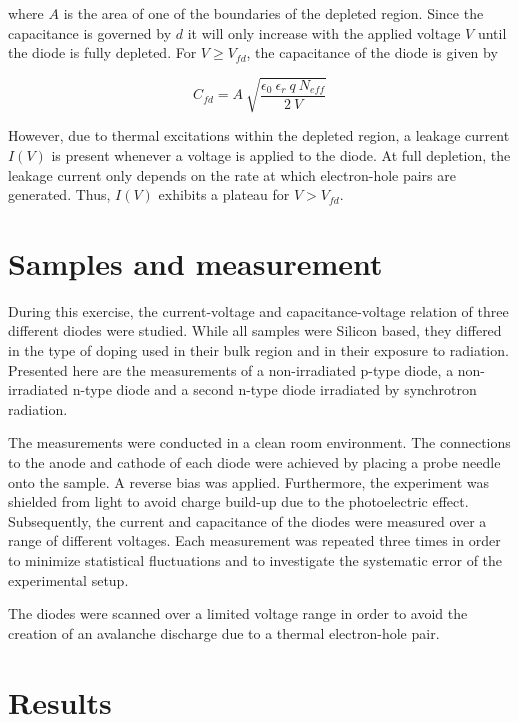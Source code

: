 \documentclass[11pt]{report}
\begin{document}
where $A$ is the area of one of the boundaries of the depleted region. Since the capacitance is governed by $d$ it will only increase with the applied voltage $V$ until the diode is fully depleted. For $V \geq V_{fd}$, the capacitance of the diode is given by

\begin{equation}
  \label{eq:1}
   C_{fd} = A ~ \sqrt{\frac{\epsilon_0 ~ \epsilon_r ~q ~ N_{eff}}{2 ~ V}}
\end{equation}

However, due to thermal excitations within the depleted region, a leakage current $I(V)$ is present whenever a voltage is applied to the diode.
At full depletion, the leakage current only depends on the rate at which electron-hole pairs are generated. Thus, $I(V)$ exhibits a plateau for $V>V_{fd}$.


\section{Samples and measurement}
\label{sec:samples}

During this exercise, the current-voltage and capacitance-voltage relation of three different diodes were studied. While all samples were Silicon based, they differed in the type of doping used in their bulk region and in their exposure to radiation.
Presented here are the measurements of a non-irradiated p-type diode, a non-irradiated n-type diode and a second n-type diode irradiated by synchrotron radiation. 

The measurements were conducted in a clean room environment. The connections to the anode and cathode of each diode were achieved by placing a probe needle onto the sample.
A reverse bias was applied.
Furthermore, the experiment was shielded from light to avoid charge build-up due to the photoelectric effect. Subsequently, the current and capacitance of the diodes were measured over a range of different voltages. Each measurement was repeated three times in order to minimize statistical fluctuations and to investigate the systematic error of the experimental setup.

The diodes were scanned over a limited voltage range in order to avoid the creation of an avalanche discharge due to a thermal electron-hole pair.


\section{Results}
\end{document}
